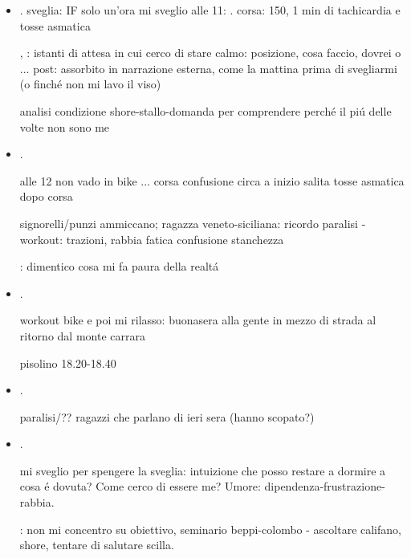 \begin{itemize}
: sonno-rabbia memoria-implso non loquor- il tutto diventa narrazione ilare 

autonarrazione: conferma-soddisfazione 

\item {}.
sveglia: IF solo un'ora mi sveglio alle 11: .
corsa: 150, 1 min di tachicardia e tosse asmatica

, : istanti di attesa in cui cerco di stare calmo: posizione, cosa faccio, dovrei o ...
post: assorbito in narrazione esterna, come la mattina prima di svegliarmi (o finch\'e non mi lavo il viso)

analisi condizione shore-stallo-domanda per comprendere perch\'e il pi\'u delle volte non sono me

\item {}.

alle 12 non vado in bike ... corsa confusione circa a inizio salita tosse asmatica dopo corsa

signorelli/punzi ammiccano; ragazza veneto-siciliana: ricordo paralisi - 
workout: trazioni, rabbia fatica confusione stanchezza

: dimentico cosa mi fa paura della realt\'a

\item {}.

workout bike e poi mi rilasso: buonasera alla gente in mezzo di strada al ritorno dal monte carrara

pisolino 18.20-18.40

\item {}.

paralisi/?? ragazzi che parlano di ieri sera (hanno scopato?)

\item {}.

mi sveglio per spengere la sveglia: intuizione che posso restare a dormire a cosa \'e dovuta? Come cerco di essere me? Umore: dipendenza-frustrazione-rabbia.

: non mi concentro su obiettivo, seminario beppi-colombo - ascoltare califano, shore, tentare di salutare scilla.


\end{itemize}
